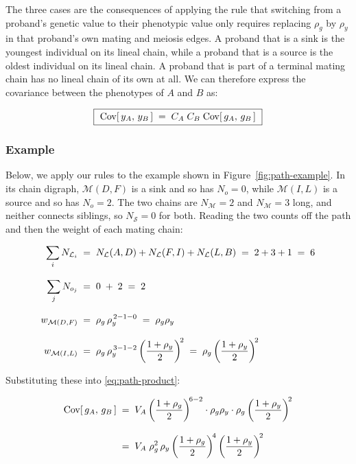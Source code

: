 \documentclass[12pt]{article}
\renewcommand{\Mu}{\mathcal{M}}
\renewcommand{\Lin}{\mathcal{L}}
\begin{document}
The three cases are the consequences of applying the rule that switching from a proband's genetic value to their phenotypic value only requires replacing $\rho_g$ by $\rho_y$ in that proband's own mating and meiosis edges.
A proband that is a sink is the youngest individual on its lineal chain, while a proband that is a source is the oldest individual on its lineal chain.
A proband that is part of a terminal mating chain has no lineal chain of its own at all.
We can therefore express the covariance between the phenotypes of $A$ and $B$ as:

\begin{equation}\label{eq:path-product-pheno}
    \boxed{\ \mathrm{Cov}[\,y_A,\, y_B\,] \;=\; C_A\; C_B\; \mathrm{Cov}[\,g_A,\, g_B\,] \ }
\end{equation}

\subsubsection{Example}
Below, we apply our rules to the example shown in Figure~\ref{fig:path-example}.
In its chain digraph, $\Mu(D,F)$ is a sink and so has $N_o = 0$, while $\Mu(I,L)$ is a source and so has $N_o = 2$.
The two chains are $N_\Mu = 2$ and $N_\Mu = 3$ long, and neither connects siblings, so $N_\mathcal{S} = 0$ for both.
Reading the two counts off the path and then the weight of each mating chain:

\begin{equation*}
\begin{aligned}
    \sum_i N_{\Lin_i} \;&=\; \Nlin(A,D) + \Nlin(F,I) + \Nlin(L,B) \;=\; 2 + 3 + 1 \;=\; 6 \\[8pt]
    \sum_j N_{o_j} \;&=\; 0 \;+\; 2 \;=\; 2 \\[8pt]
    w_{\Mu(D,F)} \;&=\; \rho_g\, \rho_y^{\,2-1-0} \;=\; \rho_g \rho_y \\[8pt]
    w_{\Mu(I,L)} \;&=\; \rho_g\, \rho_y^{\,3-1-2} \left(\frac{1+\rho_y}{2}\right)^{\!2}
    \;=\; \rho_g \left(\frac{1+\rho_y}{2}\right)^{\!2}
\end{aligned}
\end{equation*}

Substituting these into \eqref{eq:path-product}:

\begin{equation*}
\begin{aligned}
    \mathrm{Cov}[\,g_A,\, g_B\,]
    \;&=\; V_A \left(\frac{1+\rho_g}{2}\right)^{\!6-2}
    \cdot \rho_g\rho_y
    \cdot \rho_g \left(\frac{1+\rho_y}{2}\right)^{\!2} \\[8pt]
    \;&=\; V_A\; \rho_g^2\, \rho_y
    \left(\frac{1+\rho_g}{2}\right)^{\!4}
    \left(\frac{1+\rho_y}{2}\right)^{\!2}
\end{aligned}
\end{equation*}
\end{document}
